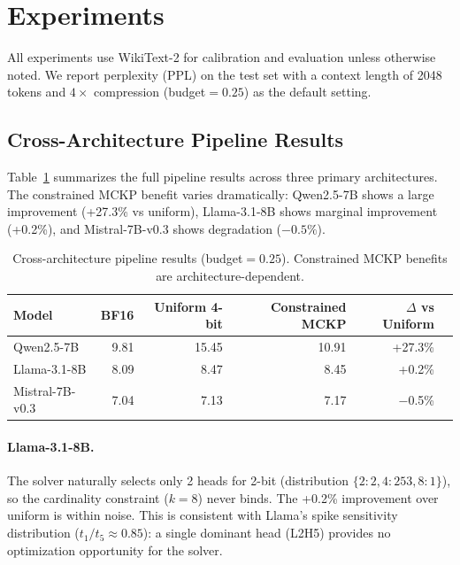 \documentclass[11pt,a4paper]{article}
\begin{document}
\section{Experiments}
\label{sec:experiments}

All experiments use WikiText-2 for calibration and evaluation unless otherwise noted.
We report perplexity (PPL) on the test set with a context length of 2048 tokens and $4\times$ compression (budget$=0.25$) as the default setting.

\subsection{Cross-Architecture Pipeline Results}

Table~\ref{tab:cross_arch} summarizes the full pipeline results across three primary architectures.
The constrained MCKP benefit varies dramatically: Qwen2.5-7B shows a large improvement (+27.3\% vs uniform), Llama-3.1-8B shows marginal improvement (+0.2\%), and Mistral-7B-v0.3 shows degradation ($-0.5\%$).

\begin{table}[h]
\centering
\caption{Cross-architecture pipeline results (budget$=0.25$). Constrained MCKP benefits are architecture-dependent.}
\label{tab:cross_arch}
\begin{tabular}{@{}lrrrrr@{}}
\toprule
Model & BF16 & Uniform 4-bit & Constrained MCKP & $\Delta$ vs Uniform \\
\midrule
Qwen2.5-7B & 9.81 & 15.45 & 10.91 & +27.3\% \\
Llama-3.1-8B & 8.09 & 8.47 & 8.45 & +0.2\% \\
Mistral-7B-v0.3 & 7.04 & 7.13 & 7.17 & $-$0.5\% \\
\bottomrule
\end{tabular}
\end{table}

\paragraph{Llama-3.1-8B.}
The solver naturally selects only 2 heads for 2-bit (distribution $\{2{:}2, 4{:}253, 8{:}1\}$), so the cardinality constraint ($k{=}8$) never binds.
The +0.2\% improvement over uniform is within noise.
This is consistent with Llama's spike sensitivity distribution ($t_1/t_5 \approx 0.85$): a single dominant head (L2H5) provides no optimization opportunity for the solver.
\end{document}
